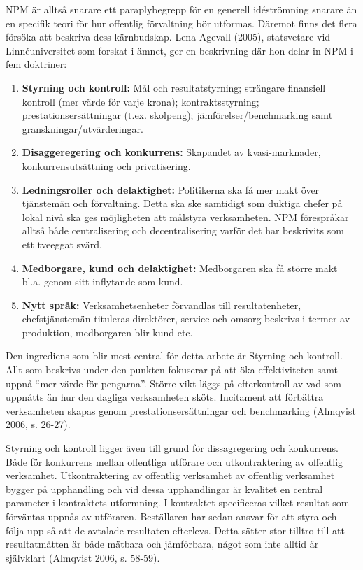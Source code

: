 NPM är alltså snarare ett paraplybegrepp för en generell idéströmning snarare än en specifik teori för hur offentlig förvaltning bör utformas. Däremot finns det flera försöka att beskriva dess kärnbudskap. Lena Agevall (2005), statsvetare vid Linnéuniversitet som forskat i ämnet, ger en beskrivning där hon delar in NPM i fem doktriner:

\begin{enumerate}
  \item \textbf{Styrning och kontroll:} Mål och resultatstyrning; strängare finansiell kontroll (mer värde för varje krona); kontraktsstyrning; prestationsersättningar (t.ex. skolpeng); jämförelser/benchmarking samt granskningar/utvärderingar.
  \item \textbf{Disaggeregering och konkurrens:} Skapandet av kvasi-marknader, konkurrensutsättning och privatisering.
  \item \textbf{Ledningsroller och delaktighet:} Politikerna ska få mer makt över tjänstemän och förvaltning. Detta ska ske samtidigt som duktiga chefer på lokal nivå ska ges möjligheten att målstyra verksamheten. NPM förespråkar alltså både centralisering och decentralisering varför det har beskrivits som ett tveeggat svärd.
  \item \textbf{Medborgare, kund och delaktighet:} Medborgaren ska få större makt bl.a. genom sitt inflytande som kund.
  \item \textbf{Nytt språk:} Verksamhetsenheter förvandlas till resultatenheter, chefstjänstemän tituleras direktörer, service och omsorg beskrivs i termer av produktion, medborgaren blir kund etc.
\end{enumerate}

Den ingrediens som blir mest central för detta arbete är Styrning och kontroll. Allt som beskrivs under den punkten fokuserar på att öka effektiviteten samt uppnå “mer värde för pengarna”. Större vikt läggs på efterkontroll av vad som uppnåtts än hur den dagliga verksamheten sköts. Incitament att förbättra verksamheten skapas genom prestationsersättningar och benchmarking (Almqvist 2006, s. 26-27).
 
Styrning och kontroll ligger även till grund för dissagregering och konkurrens. Både för konkurrens mellan offentliga utförare och utkontraktering av offentlig verksamhet. Utkontraktering av offentlig verksamhet av offentlig verksamhet bygger på upphandling och vid dessa upphandlingar är kvalitet en central parameter i kontraktets utformning. I kontraktet specificeras vilket resultat som förväntas uppnås av utföraren. Beställaren har sedan ansvar för att styra och följa upp så att de avtalade resultaten efterlevs. Detta sätter stor tilltro till att resultatmåtten är både mätbara och jämförbara, något som inte alltid är självklart (Almqvist 2006, s. 58-59).
 
